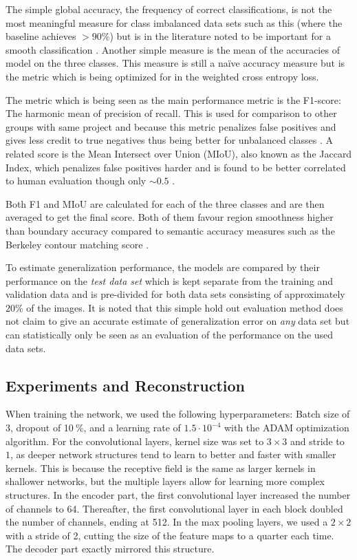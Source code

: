 \documentclass{article}
\newcommand{\pro}{\ensuremath{\ \%}}
\begin{document}
The simple global accuracy, the frequency of correct classifications, is not the most meaningful measure for class imbalanced data sets such as this (where the baseline achieves \(>90\%\)) but is in the literature noted to be important for a smooth classification \cite{seg}. Another simple measure is the mean of the accuracies of model on the three classes. This measure is still a naïve accuracy measure but is the metric which is being optimized for in the weighted cross entropy loss. 

The metric which is being seen as the main performance metric is the F1-score: The harmonic mean of precision of recall. This is used for comparison to other groups with same project and because this metric penalizes false positives and gives less credit to true negatives thus being better for unbalanced classes \cite{Metric}. A related score is the Mean Intersect over Union (MIoU), also known as the Jaccard Index, which penalizes false positives harder and is found to be better correlated to human evaluation though only \(\sim 0.5\) \cite{eval}. 

Both F1 and MIoU are calculated for each of the three classes and are then averaged to get the final score. Both of them favour region smoothness higher than boundary accuracy compared to semantic accuracy measures such as the Berkeley contour matching score \cite{seg}.

To estimate generalization performance, the models are compared by their performance on the \textit{test data set} which is kept separate from the training and validation data and is pre-divided for both data sets consisting of approximately \( 20\%\) of the images.  It is noted that this simple hold out evaluation method does not claim to give an accurate estimate of generalization error on \textit{any} data set but can statistically only be seen as an evaluation of the performance on the used data sets. 

\subsection{Experiments and Reconstruction}
When training the network, we used the following hyperparameters: Batch size of 3, dropout of 10\pro, and a learning rate of $ 1.5\cdot 10^{-4} $ with the ADAM optimization algorithm.
For the convolutional layers, kernel size was set to $ 3\times 3 $ and stride to $ 1 $, as deeper network structures tend to learn to better and faster with smaller kernels.
This is because the receptive field is the same as larger kernels in shallower networks, but the multiple layers allow for learning more complex structures.
In the encoder part, the first convolutional layer increased the number of channels to 64.
Thereafter, the first convolutional layer in each block doubled the number of channels, ending at 512.
In the max pooling layers, we used a $ 2\times 2 $ with a stride of 2, cutting the size of the feature maps to a quarter each time.
The decoder part exactly mirrored this structure.
\end{document}
